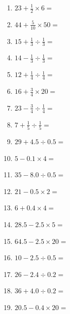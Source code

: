 \documentclass[12pt]{article}
\begin{document}
\begin{enumerate}
\item \large $ 23 + \frac{1}{2} \times 6 = $ \vspace{1.6cm}
\item \large $ 44 + \frac{5}{10} \times 50 = $ \vspace{1.6cm}
\item \large $ 15 + \frac{1}{3} \div \frac{1}{3} = $ \vspace{1.6cm}
\newpage
\item \large $ 14 - \frac{1}{3} \div \frac{1}{3} = $ \vspace{1.6cm}
\item \large $ 12 + \frac{1}{4} \div \frac{1}{4} = $ \vspace{1.6cm}
\item \large $ 16 + \frac{3}{4} \times 20 = $ \vspace{1.6cm}
\item \large $ 23 - \frac{3}{4} \div \frac{1}{4} = $ \vspace{1.6cm}
\item \large $ 7 + \frac{1}{5} \div \frac{1}{5} = $ \vspace{1.6cm}
\item \large $ 29 + 4.5 \div 0.5 = $ \vspace{1.6cm}
\item \large $ 5 - 0.1 \times 4 = $ \vspace{1.6cm}
\item \large $ 35 - 8.0 \div 0.5 = $ \vspace{1.6cm}
\item \large $ 21 - 0.5 \times 2 = $ \vspace{1.6cm}
\item \large $ 6 + 0.4 \times 4 = $ \vspace{1.6cm}
\newpage
\item \large $ 28.5 - 2.5 \times 5 = $ \vspace{1.6cm}
\item \large $ 64.5 - 2.5 \times 20 = $ \vspace{1.6cm}
\item \large $ 10 - 2.5 \div 0.5 = $ \vspace{1.6cm}
\item \large $ 26 - 2.4 \div 0.2 = $ \vspace{1.6cm}
\item \large $ 36 + 4.0 \div 0.2 = $ \vspace{1.6cm}
\item \large $ 20.5 - 0.4 \times 20 = $ \vspace{1.6cm}

\end{enumerate}
\end{document}
